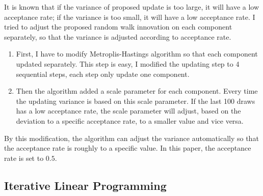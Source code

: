 \documentclass[12pt]{article}
\theoremstyle{plain} \newtheorem{theorem}{Theorem}
\theoremstyle{definition} \newtheorem{definition}{Definition}
\begin{document}
It is known that if the variance of proposed update is too large, it will have a low acceptance rate; if the variance is too small, it will have a low acceptance rate. I tried to adjust the proposed random walk innovation on each component separately, so that the variance is adjusted according to acceptance rate.

\begin{enumerate}
    \item First, I have to modify Metroplis-Hastings algorithm so that each component updated separately. This step is easy, I modified the updating step to 4 sequential steps, each step only update one component.
    \item Then the algorithm added a scale parameter for each component. Every time the updating variance is based on this scale parameter. If the last 100 draws has a low acceptance rate, the scale parameter will adjust, based on the deviation to a specific acceptance rate, to a smaller value and vice versa.
\end{enumerate}

By this modification, the algorithm can adjust the variance automatically so that the acceptance rate is roughly to a specific value. In this paper, the acceptance rate is set to $0.5$.

\subsection{Iterative Linear Programming}
\label{sec:iter-line-progr}
\end{document}
